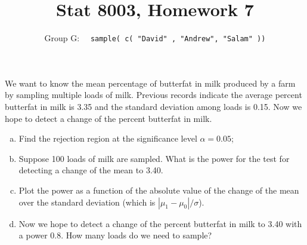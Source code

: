 \documentclass[12pt]{article}
\newenvironment{question}[2][Question]{\begin{trivlist}
\item[\hskip \labelsep {\bfseries #1}\hskip \labelsep {\bfseries #2.}]}{\end{trivlist}}
\begin{document}
 \renewcommand{\arraystretch}{1.3}
 \renewcommand{\thefootnote}{\fnsymbol{footnote}}	
 
\title{Stat 8003, Homework 7}%
\author{Group G: \ \ \texttt{sample( c( "David" , "Andrew",  "Salam" ))}
\\ %
} %
 
\maketitle
 
 \begin{question}{7.1} We want to know the mean percentage of butterfat in milk produced by a farm by sampling
multiple loads of milk. Previous records indicate the average percent butterfat in milk is 3.35
and the standard deviation among loads is 0.15. Now we hope to detect a change of the percent
butterfat in milk.  

\begin{enumerate}[(a)]
\item Find the rejection region at the significance level $\alpha = 0.05$;
\item Suppose 100 loads of milk are sampled. What is the power for the test for detecting a change of the mean to 3.40.
\item Plot the power as a function of the absolute value of the change of the mean over the standard deviation (which is $ | \mu_1 - \mu_0 | / \sigma$).
\item Now we hope to detect a change of the percent butterfat in milk to 3.40 with a power 0.8. How many loads do we need to sample?
\end{enumerate}

\end{question} 
\end{document}
